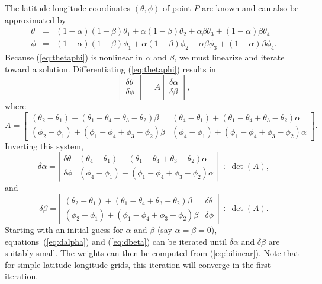 \documentclass[12pt]{report}
\begin{document}
The latitude-longitude coordinates $(\theta,\phi)$ of
point $P$ are known and can also be approximated by
\begin{eqnarray}\label{eq:thetaphi}
\theta & = & (1-\alpha)(1-\beta)\theta_1 + \alpha(1-\beta)\theta_2 + \nonumber
          \alpha\beta \theta_3 + (1-\alpha)\beta \theta_4 \\
\phi   & = & (1-\alpha)(1-\beta)\phi_1   + \alpha(1-\beta)\phi_2 +
          \alpha\beta \phi_3 + (1-\alpha)\beta \phi_4.
\end{eqnarray}
Because (\ref{eq:thetaphi}) is nonlinear in $\alpha$ and $\beta$,
we must linearize and iterate toward a solution.  Differentiating
(\ref{eq:thetaphi}) results in
\begin{equation}
\left[\begin{array}{c} \delta\theta \\ \delta\phi \end{array}\right]
= A
\left[\begin{array}{c} \delta\alpha \\ \delta\beta \end{array}\right],
\end{equation}
where
\begin{equation}
A = \left[\begin{array}{cc}
(\theta_2-\theta_1) + (\theta_1-\theta_4+\theta_3-\theta_2)\beta &
(\theta_4-\theta_1) + (\theta_1-\theta_4+\theta_3-\theta_2)\alpha \\
(\phi_2-\phi_1) + (\phi_1-\phi_4+\phi_3-\phi_2)\beta &
(\phi_4-\phi_1) + (\phi_1-\phi_4+\phi_3-\phi_2)\alpha
\end{array}\right].
\end{equation}
Inverting this system,
\begin{equation}\label{eq:dalpha}
\delta\alpha = \left|\begin{array}{cc}
\delta\theta &
(\theta_4-\theta_1) + (\theta_1-\theta_4+\theta_3-\theta_2)\alpha \\
\delta\phi &
(\phi_4-\phi_1) + (\phi_1-\phi_4+\phi_3-\phi_2)\alpha
\end{array}\right| \div \det(A),
\end{equation}
and
\begin{equation}\label{eq:dbeta}
\delta\beta
= \left|\begin{array}{cc}
(\theta_2-\theta_1) + (\theta_1-\theta_4+\theta_3-\theta_2)\beta &
\delta\theta \\
(\phi_2-\phi_1) + (\phi_1-\phi_4+\phi_3-\phi_2)\beta &
\delta\phi
\end{array}\right| \div \det(A).
\end{equation}
Starting with an initial guess for $\alpha$ and $\beta$
(say $\alpha=\beta=0$), equations~(\ref{eq:dalpha}) and
(\ref{eq:dbeta}) can be iterated until
$\delta\alpha$ and $\delta\beta$ are suitably small.  The
weights can then be computed from (\ref{eq:bilinear}).  Note
that for simple latitude-longitude grids, this iteration
will converge in the first iteration.
\end{document}
